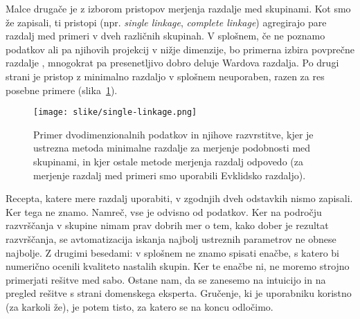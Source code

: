 Malce drugače je z izborom pristopov merjenja razdalje med skupinami. Kot smo že zapisali, ti pristopi (npr. {\em single linkage}, {\em complete linkage}) agregirajo pare razdalj med primeri v dveh različnih skupinah. V splošnem, če ne poznamo podatkov ali pa njihovih projekcij v nižje dimenzije, bo primerna izbira povprečne razdalje , mnogokrat pa presenetljivo dobro deluje Wardova razdalja. Po drugi strani je pristop z minimalno razdaljo  v splošnem neuporaben, razen za res posebne primere (slika~\ref{f-single-linkage}).

\begin{figure}[htbp]
\begin{center}
\texttt{[image: slike/single-linkage.png]}
\caption{Primer dvodimenzionalnih podatkov in njihove razvrstitve, kjer je ustrezna metoda minimalne razdalje za merjenje podobnosti med skupinami, in kjer ostale metode merjenja razdalj odpovedo (za merjenje razdalj med primeri smo uporabili Evklidsko razdaljo).}
\label{f-single-linkage}
\end{center}
\end{figure}

Recepta, katere mere razdalj uporabiti, v zgodnjih dveh odstavkih nismo zapisali. Ker tega ne znamo. Namreč, vse je odvisno od podatkov. Ker na področju razvrščanja v skupine nimam prav dobrih mer o tem, kako dober je rezultat razvrščanja, se avtomatizacija iskanja najbolj ustreznih parametrov ne obnese najbolje. Z drugimi besedami: v splošnem ne znamo spisati enačbe, s katero bi numerično ocenili kvaliteto nastalih skupin. Ker te enačbe ni, ne moremo strojno primerjati rešitve med sabo. Ostane nam, da se zanesemo na intuicijo in na pregled rešitve s strani domenskega eksperta. Gručenje, ki je uporabniku koristno (za karkoli že), je potem tisto, za katero se na koncu odločimo.
